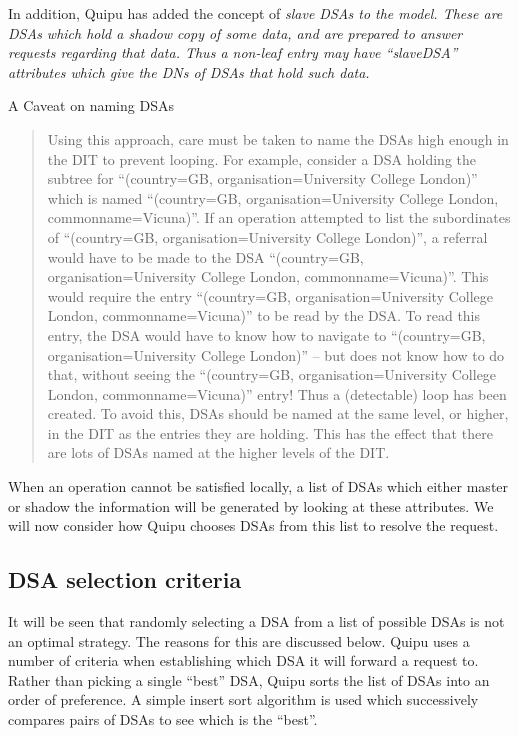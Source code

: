 In addition, Quipu has added the concept of 
\it
slave
\rm
DSAs to the model.
These are DSAs which hold a shadow copy of some data, and are prepared
to answer requests regarding that data.  
Thus a non-leaf entry may have ``slaveDSA'' attributes which give the DNs of
DSAs that hold such data.
\bf
\par\vspace{1.0\baselineskip}
A Caveat on naming DSAs
\rm
\begin{quote}
Using this approach, care must be taken to name the DSAs high enough in the
DIT to prevent looping.
For example, consider a DSA holding the subtree for ``(country=GB,
organisation=University College London)'' which is named
``(country=GB, organisation=University College London, commonname=Vicuna)''.
If an operation attempted to list the subordinates of ``(country=GB,
organisation=University 
College London)'', a referral would have to be made to the DSA 
``(country=GB, organisation=University College London, commonname=Vicuna)''.
This would require the  
entry ``(country=GB, organisation=University College London,
commonname=Vicuna)'' to be read by the DSA. 
To read this entry, the DSA would have to know how to navigate to 
``(country=GB, organisation=University College London)'' -- but does not know
how to do that,
without seeing the ``(country=GB, organisation=University College London,
commonname=Vicuna)'' 
entry!
Thus a (detectable) loop has been created.
To avoid this, DSAs should be named at the same level, or higher, in the DIT as
the entries they are holding.
This has the effect that there are lots of DSAs named at the higher
levels of the DIT.
\end{quote}

When an operation cannot be satisfied locally,
a list of DSAs which either master or shadow the information will be 
generated by looking at these attributes.
We will now consider how Quipu chooses DSAs from this list to resolve
the request.
\subsection{DSA selection criteria}

It will be seen that randomly selecting a DSA from a list of possible DSAs
is not an optimal strategy.  The reasons for this are discussed below.
Quipu uses a number of criteria when establishing which DSA it will forward
a request to.  Rather than picking a single ``best'' DSA, Quipu sorts the list
of DSAs into an order of preference.  
A simple insert sort algorithm is used which successively compares pairs
of DSAs to see which is the ``best''.

